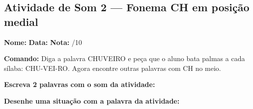 

\subsection{Atividade de Som 2 --- Fonema CH em posição medial}
\begin{exercicio}



\noindent\textbf{Nome:} \underline{\hspace{3.2cm}} \quad \textbf{Data:} \underline{\hspace{1.6cm}} \quad \textbf{Nota:} \underline{\hspace{0.9cm}}/10


\noindent\textbf{Comando:} Diga a palavra CHUVEIRO e peça que o aluno bata palmas a cada sílaba: CHU-VEI-RO. Agora encontre outras palavras com CH no meio.


\begin{center}
\end{center}

\noindent\textbf{Escreva 2 palavras com o som da atividade:}

\begin{center}
  \underline{\hspace{3cm}} \quad \underline{\hspace{3cm}}
\end{center}

\noindent\textbf{Desenhe uma situação com a palavra da atividade:}

\begin{center}
\end{center}

\end{exercicio}



